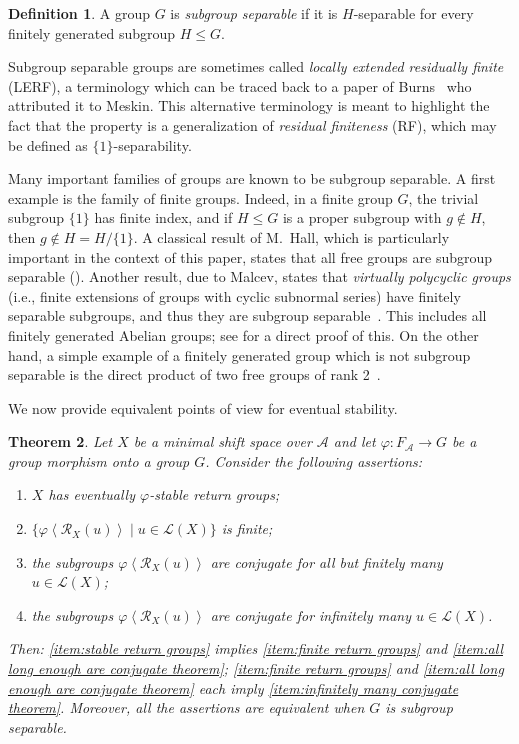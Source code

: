 \documentclass{amsart}
\newcommand*{\ret}{\mathcal{R}}
\newcommand*{\lang}{\mathcal{L}}
\newcommand*{\cA}{\mathcal{A}}
\newcommand*{\from}{\colon}
\newcommand*{\gen}[1]{\left\langle #1\right\rangle}
\theoremstyle{plain}
\newtheorem{theorem}{Theorem}
\theoremstyle{definition}
\newtheorem{definition}[theorem]{Definition}
\theoremstyle{remark}
\begin{document}
\begin{definition}
    A group $G$ is \emph{subgroup separable} if it is $H$-separable for every finitely generated subgroup $H\leq G$. 
\end{definition}

Subgroup separable groups are sometimes called \emph{locally extended residually finite} (LERF), a terminology which can be traced back to a paper of Burns~\cite{Burns1971} who attributed it to Meskin. This alternative terminology is meant to highlight the fact that the property is a generalization of \emph{residual finiteness} (RF), which may be defined as $\{1\}$-separability.

Many important families of groups are known to be subgroup separable. A first example is the family of finite groups. Indeed, in a finite group $G$, the trivial subgroup $\{1\}$ has finite index, and if $H \leq G$ is a proper subgroup with $g\notin H$, then $g \notin H = H/\{1\}$. A classical result of M.~Hall, which is particularly important in the context of this paper, states that all free groups are subgroup separable (\cite[Theorem~5.1]{Hall1949}). Another result, due to Malcev, states that \emph{virtually polycyclic groups} (i.e., finite extensions of groups with cyclic subnormal series) have finitely separable subgroups, and thus they are subgroup separable~\cite{Malcev1983}. This includes all finitely generated Abelian groups; see \cite[Lemma~4.2]{Steinberg1999} for a direct proof of this. On the other hand, a simple example of a finitely generated group which is not subgroup separable is the direct product of two free groups of rank 2~\cite{Allenby1973}.

We now provide equivalent points of view for eventual stability.

\begin{theorem}\label{thm:main}
    Let $X$ be a minimal shift space over $\cA$ and let $\varphi\from F_\cA\to G$ be a group morphism onto a group $G$. Consider the following assertions:
    \begin{enumerate}
        \item\label{item:stable return groups} $X$ has eventually $\varphi$-stable return groups;
        \item\label{item:finite return groups} $\{\varphi\gen{\ret_X(u)} \mid u \in \lang(X)\}$ is finite;
        \item\label{item:all long enough are conjugate theorem} the subgroups $\varphi\gen{\ret_X(u)}$ are conjugate for all but finitely many $u \in \lang(X)$;
        \item\label{item:infinitely many conjugate theorem} the subgroups $\varphi\gen{\ret_X(u)}$ are conjugate for infinitely many $u \in \lang(X)$.
    \end{enumerate}
    Then: \ref{item:stable return groups} implies \ref{item:finite return groups} and \ref{item:all long enough are conjugate theorem}; \ref{item:finite return groups} and \ref{item:all long enough are conjugate theorem} each imply \ref{item:infinitely many conjugate theorem}. Moreover, all the assertions are equivalent when $G$ is subgroup separable.
\end{theorem}
\end{document}
